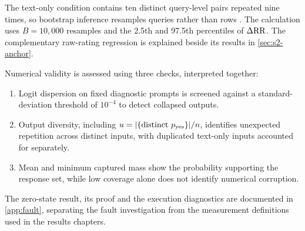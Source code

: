 The text-only condition contains ten distinct query-level pairs repeated
nine times, so bootstrap inference resamples queries rather than rows
\cite{field2007bootstrapping,efron1993bootstrap}. The calculation uses
$B=10{,}000$ resamples and the 2.5th and 97.5th percentiles of $\Delta\mathrm{RR}$. The complementary raw-rating
regression is explained beside its results in \cref{sec:s2-anchor}.

Numerical validity is assessed using three checks, interpreted together:

\begin{enumerate}[leftmargin=*,itemsep=0.5em]
\item Logit dispersion on fixed diagnostic prompts is screened against a
standard-deviation threshold of $10^{-4}$ to detect collapsed outputs.

\item Output diversity, including
$u=|\{\text{distinct }p_{\mathrm{yes}}\}|/n$, identifies unexpected repetition across
distinct inputs, with duplicated text-only inputs accounted for separately.

\item Mean and minimum captured mass show the probability supporting the
response set, while low coverage alone does not identify numerical corruption.
\end{enumerate}

The zero-state result, its proof and the execution diagnostics are documented
in \cref{app:fault}, separating the fault investigation from the measurement
definitions used in the results chapters.

